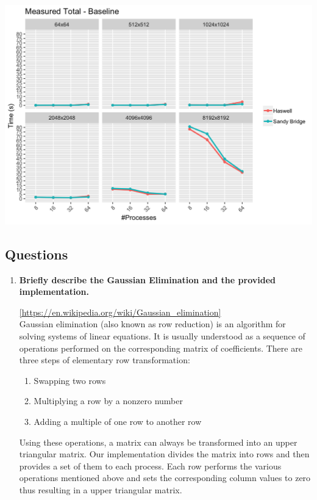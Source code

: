 \documentclass[10pt, letterpaper, twoside]{article}
\begin{document}
\begin{titlepage}
\begin{enumerate}
\includegraphics[scale = 0.18]{Baseline_Measured-Total_InputSize.png}

\end{enumerate} 

\subsection{Questions}

\begin{enumerate}
\item\textbf{Briefly describe the Gaussian Elimination and the provided implementation.} 

\url{[https://en.wikipedia.org/wiki/Gaussian_elimination]} \\	
Gaussian elimination (also known as row reduction) is an algorithm for solving systems of linear equations. It is usually understood as a sequence of operations performed on the corresponding matrix of coefficients. There are three steps of elementary row transformation:
\begin{enumerate}
\item{Swapping two rows}
\item{Multiplying a row by a nonzero number}
\item{Adding a multiple of one row to another row}
\end{enumerate}
Using these operations, a matrix can always be transformed into an upper triangular matrix. Our implementation divides the matrix into rows and then provides a set of them to each process. Each row performs the various operations mentioned above and sets the corresponding column values to zero thus resulting in a upper triangular matrix. 
	

\end{enumerate}
\end{titlepage}
\end{document}
